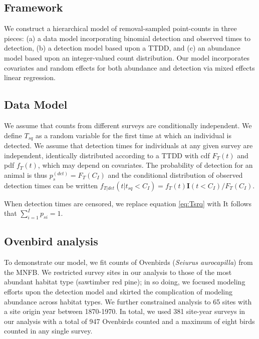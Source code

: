 \documentclass[useAMS,usenatbib,referee,12pt]{article}
\begin{document}
  


\subsection{Framework}

We construct a hierarchical model of removal-sampled point-counts in three pieces: (a) a data model incorporating binomial detection and observed times to detection, (b) a detection model based upon a TTDD, and (c) an abundance model based upon an integer-valued count distribution.  
Our model incorporates covariates and random effects for both abundance and detection via mixed effects linear regression.

\subsection{Data Model}
We assume that counts from different surveys are conditionally independent.  
We define $T_{sq}$ as a random variable for the first time at which an individual is detected.
We assume that detection times for individuals at any given survey are independent, identically distributed according to a TTDD with cdf $F_T(t)$ and pdf $f_T(t)$, which may depend on covariates.  
The probability of detection for an animal is thus $p_{s}^{(det)} = F_T(C_I)$ and the conditional distribution of observed detection times can be written $f_{T|det}(t|t_{sq}<C_I) = f_T(t) \textbf{I}(t<C_I) / F_T(C_I)$.  

When detection times are censored, we replace equation \ref{eq:Tsrq} with 
It follows that $\sum_{i=1}^I p_{si} = 1$.







\subsection{Ovenbird analysis}\label{sec:ovenbirdanalysis}

To demonstrate our model, we fit counts of Ovenbirds (\textit{Seiurus aurocapilla}) from the MNFB.
We restricted survey sites in our analysis to those of the most abundant habitat type (sawtimber red pine); in so doing, we focused modeling efforts upon the detection model and skirted the complication of modeling abundance across habitat types.  
We further constrained analysis to 65 sites with a site origin year between 1870-1970.  
In total, we used 381 site-year surveys in our analysis with a total of 947 Ovenbirds counted and a maximum of eight birds counted in any single survey.
\end{document}
